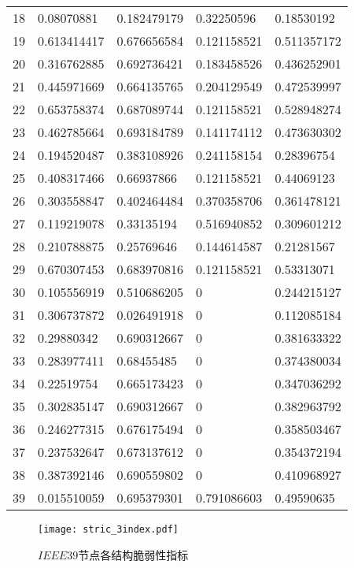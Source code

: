 \begin{table}[H]
\begin{tabular}{C{1.5cm}C{2.05cm}C{2.5cm}C{2.85cm}C{3.5cm}}
  18 & 0.08070881  & 0.182479179 & 0.32250596  & 0.18530192 \\ 
  19 & 0.613414417 & 0.676656584 & 0.121158521 & 0.511357172 \\ 
  20 & 0.316762885 & 0.692736421 & 0.183458526 & 0.436252901 \\ 
  21 & 0.445971669 & 0.664135765 & 0.204129549 & 0.472539997 \\ 
  22 & 0.653758374 & 0.687089744 & 0.121158521 & 0.528948274 \\ 
  23 & 0.462785664 & 0.693184789 & 0.141174112 & 0.473630302 \\ 
  24 & 0.194520487 & 0.383108926 & 0.241158154 & 0.28396754 \\ 
  25 & 0.408317466 & 0.66937866  & 0.121158521 & 0.44069123 \\ 
  26 & 0.303558847 & 0.402464484 & 0.370358706 & 0.361478121 \\ 
  27 & 0.119219078 & 0.33135194  & 0.516940852 & 0.309601212 \\ 
  28 & 0.210788875 & 0.25769646  & 0.144614587 & 0.21281567 \\ 
  29 & 0.670307453 & 0.683970816 & 0.121158521 & 0.53313071 \\ 
  30 & 0.105556919 & 0.510686205 & 0           & 0.244215127 \\ 
  31 & 0.306737872 & 0.026491918 & 0           & 0.112085184 \\ 
  32 & 0.29880342  & 0.690312667 & 0           & 0.381633322 \\ 
  33 & 0.283977411 & 0.68455485  & 0           & 0.374380034 \\ 
  34 & 0.22519754  & 0.665173423 & 0           & 0.347036292 \\ 
  35 & 0.302835147 & 0.690312667 & 0           & 0.382963792 \\ 
  36 & 0.246277315 & 0.676175494 & 0           & 0.358503467 \\ 
  37 & 0.237532647 & 0.673137612 & 0           & 0.354372194 \\ 
  38 & 0.387392146 & 0.690559802 & 0           & 0.410968927 \\ 
  39 & 0.015510059 & 0.695379301 & 0.791086603 & 0.49590635 \\ 
  \bottomrule
  \end{tabular}
\end{table}

\begin{figure}[H] %
  \centering
  \texttt{[image: stric\_3index.pdf]}
  \caption{$IEEE39$节点各结构脆弱性指标}
  \label{fig:stric_3index}
\end{figure}

